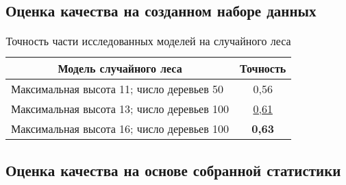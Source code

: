 \subsection{Оценка качества на созданном наборе данных}
\begin{table}[!h]
\caption{Точность части исследованных моделей на случайного леса}\label{rf-offline-result-table}
\centering
\begin{tabular}{|l|c|}\hline
\multicolumn{1}{|c|}{\textbf{Модель случайного леса}} & \textbf{Точность}\\\hline
Максимальная высота 11; число деревьев 50 & 0,56\\\hline
Максимальная высота 13; число деревьев 100 & \uline{0,61} \\\hline
Максимальная высота 16; число деревьев 100  & \textbf{0,63} \\\hline
\end{tabular}
\end{table}
\subsection{Оценка качества на основе собранной статистики}
\chapterconclusion